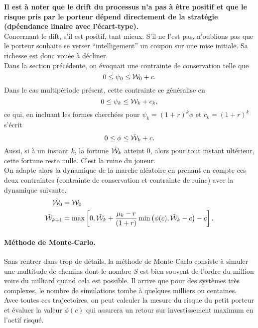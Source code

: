 \documentclass{article}
\numberwithin{equation}{section}
\begin{document}
\textbf{\color{awesomePurple}Il est à noter que le drift du processus n'a pas à être positif et que le risque pris par le porteur dépend directement de la stratégie (dpéendance linaire avec l'écart-type).}\\

Concernant le dift, s'il est positif, tant mieux. S'il ne l'est pas, n'oublions pas que le porteur souhaite se verser ``intelligement'' un coupon sur une mise initiale. Sa richesse est donc vouée à décliner.\\

Dans la section précédente, on évoquait une contrainte de conservation telle que 
$$
0\leq\psi_0 \leq \mathcal{W}_0 + c.
$$
Dans le cas multipériode présent, cette contrainte ce généralise en
$$
0\leq\psi_k\leq\mathcal{W}_k + c_k,
$$
ce qui, en incluant les formes cherchées pour $\psi_k = (1 + r)^k\phi$ et $c_k = (1 + r)^k$ s'écrit
\begin{equation}
0\leq\phi\leq\tilde{\mathcal{W}}_k + c.
\end{equation}
Aussi, si à un instant $k$, la fortune $\tilde{\mathcal{W}}_k$ atteint 0, alors pour tout instant ultérieur, cette fortune reste nulle. C'est la ruine du joueur.\\

On adapte alors la dynamique de la marche aléatoire en prenant en compte ces deux contraintes (contrainte de conservation et contrainte de ruine) avec la dynamique suivante.
\begin{equation*}
\begin{split}
\tilde {\mathcal{W}}_0 &=  \mathcal{W}_0\\
\tilde{\mathcal{W}}_{k + 1} &= \max\left[0, \tilde{\mathcal{W}}_k + \frac{\mu_k - r}{(1 + r)}\min\left(\phi(c), \tilde{\mathcal{W}}_k - c\right) - c\right].
\end{split}
\end{equation*}

\paragraph{Méthode de Monte-Carlo.} Sans rentrer dans trop de détails, la méthode de Monte-Carlo consiste à simuler une multitude de chemins dont le nombre $S$ est bien souvent de l'ordre du million voire du milliard quand cela est possible. Il arrive que pour des systèmes très complexes, le nombre de simulations tombe à quelques milliers ou centaines.\\

Avec toutes ces trajectoires, on peut calculer la mesure du risque du petit porteur et évaluer la valeur $\phi(c)$  qui assurera un retour sur investissement maximum en l'actif risqué.
\end{document}

